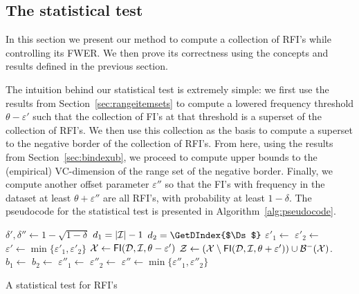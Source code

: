 \subsection{The statistical test}\label{sec:algo}
In this section we present our method to compute a collection of RFI's while
controlling its FWER. We then prove its correctness using the concepts and
results defined in the previous section.

The intuition behind our statistical test is extremely simple: we first use the
results from Section~\ref{sec:rangeitemsets} to compute a lowered frequency threshold
$\theta-\varepsilon'$ such that the collection of FI's at that threshold is a
superset of the collection of RFI's. We then use this collection as the basis to
compute a superset to the negative border of the collection of RFI's. From here,
using the results from Section~\ref{sec:bindexub}, we proceed to compute upper
bounds to the (empirical) VC-dimension of the range set of the negative border.
Finally, we compute another offset parameter $\varepsilon''$ so that the FI's
with frequency in the dataset at least $\theta+\varepsilon''$ are all RFI's,
with probability at least $1-\delta$. The pseudocode for the statistical test is
presented in Algorithm~\ref{alg:pseudocode}.

\begin{algorithm}[ht]
  \DontPrintSemicolon
  $\delta',\delta''\leftarrow 1-\sqrt{1-\delta}$\; 
  $d_1 = |{\cal I}|-1$\;
  $d_2 = \GetDIndex{$\Ds$}$\;
  $\varepsilon'_1\leftarrow$ \;\label{algline:epsVC}
  $\varepsilon'_2\leftarrow$ \;\label{algline:epsEVC}
  $\varepsilon'\leftarrow\min\{\varepsilon'_1,\varepsilon'_2\}$\;
  $\mathcal{X}\leftarrow\mathsf{FI}({\cal D},{\cal I},\theta-\varepsilon')$\;\label{algline:mining}
  $\mathcal{Z}\leftarrow (\mathcal{X} \setminus \mathsf{FI}({\cal D},{\cal I},\theta+\varepsilon')) \cup
  \mathcal{B}^-(\mathcal{X})$.\;\label{algline:candidates}
  $b_1\leftarrow$
  \;\label{algline:ASUKP}
  $b_2\leftarrow$
  \;\label{algline:empASUKP}
  $\varepsilon''_1\leftarrow$ \;
  $\varepsilon''_2 \leftarrow$ \;
  $\varepsilon''\leftarrow\min\{\varepsilon''_1,\varepsilon''_2\}$\;
  \;
  \caption{A statistical test for RFI's}\label{alg:pseudocode}
\end{algorithm}

